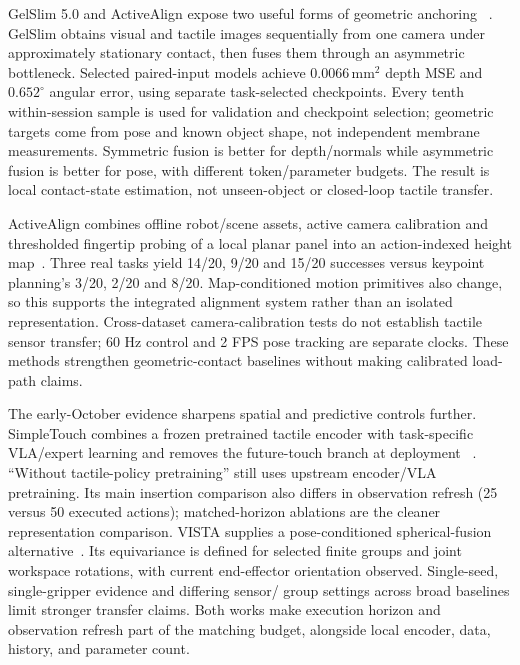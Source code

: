 GelSlim 5.0 and ActiveAlign expose two useful forms of geometric anchoring
~\cite{update2026gelslimfive,update2026activealign}. GelSlim obtains visual and
tactile images sequentially from one camera under approximately stationary
contact, then fuses them through an asymmetric bottleneck. Selected paired-input
models achieve $0.0066\,\mathrm{mm}^2$ depth MSE and $0.652^\circ$ angular error,
using separate task-selected checkpoints. Every tenth within-session sample is
used for validation and checkpoint selection; geometric targets come from pose
and known object shape, not independent membrane measurements. Symmetric fusion
is better for depth/normals while asymmetric fusion is better for pose, with
different token/parameter budgets. The result is local contact-state estimation,
not unseen-object or closed-loop tactile transfer.

ActiveAlign combines offline robot/scene assets, active camera calibration and
thresholded fingertip probing of a local planar panel into an action-indexed
height map~\cite{update2026activealign}. Three real tasks yield 14/20, 9/20 and
15/20 successes versus keypoint planning's 3/20, 2/20 and 8/20. Map-conditioned
motion primitives also change, so this supports the integrated alignment system
rather than an isolated representation. Cross-dataset camera-calibration tests
do not establish tactile sensor transfer; 60 Hz control and 2 FPS pose tracking
are separate clocks. These methods strengthen geometric-contact baselines
without making calibrated load-path claims.

The early-October evidence sharpens spatial and predictive controls further.
SimpleTouch combines a frozen pretrained tactile encoder with task-specific
VLA/expert learning and removes the future-touch branch at deployment
~\cite{yang2026simpletouch}. ``Without tactile-policy pretraining'' still uses
upstream encoder/VLA pretraining. Its main insertion comparison also differs in
observation refresh (25 versus 50 executed actions); matched-horizon ablations
are the cleaner representation comparison. VISTA supplies a pose-conditioned
spherical-fusion alternative~\cite{wong2026vista}. Its equivariance is defined for
selected finite groups and joint workspace rotations, with current end-effector
orientation observed. Single-seed, single-gripper evidence and differing sensor/
group settings across broad baselines limit stronger transfer claims. Both works
make execution horizon and observation refresh part of the matching budget,
alongside local encoder, data, history, and parameter count.

